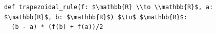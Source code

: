 \documentclass[border=10pt]{standalone}
\begin{document}
\begin{lstlisting}
def trapezoidal_rule(f: $\mathbb{R} \\to \\mathbb{R}$, a: $\mathbb{R}$, b: $\mathbb{R}$) $\to$ $\mathbb{R}$:
  (b - a) * (f(b) + f(a))/2
\end{lstlisting}
\end{document}
